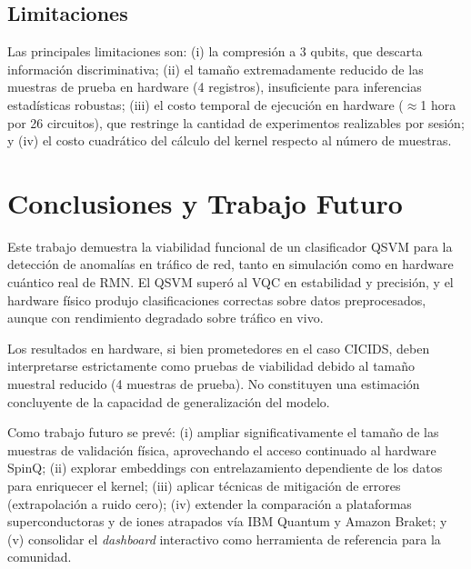 \documentclass[10pt,conference]{IEEEtran}
\begin{document}
\subsection{Limitaciones}
Las principales limitaciones son: (i) la compresión a 3 qubits, que
descarta información discriminativa; (ii) el tamaño extremadamente
reducido de las muestras de prueba en hardware (4 registros),
insuficiente para inferencias estadísticas robustas; (iii) el costo
temporal de ejecución en hardware ($\approx$1 hora por 26 circuitos),
que restringe la cantidad de experimentos realizables por sesión; y
(iv) el costo cuadrático del cálculo del kernel respecto al número de
muestras.

\section{Conclusiones y Trabajo Futuro}
Este trabajo demuestra la viabilidad funcional de un clasificador QSVM
para la detección de anomalías en tráfico de red, tanto en simulación
como en hardware cuántico real de RMN. El QSVM superó al VQC en
estabilidad y precisión, y el hardware físico produjo clasificaciones
correctas sobre datos preprocesados, aunque con rendimiento degradado
sobre tráfico en vivo.

Los resultados en hardware, si bien prometedores en el caso CICIDS,
deben interpretarse estrictamente como pruebas de viabilidad debido al
tamaño muestral reducido (4 muestras de prueba). No constituyen una
estimación concluyente de la capacidad de generalización del modelo.

Como trabajo futuro se prevé: (i) ampliar significativamente el tamaño
de las muestras de validación física, aprovechando el acceso continuado
al hardware SpinQ; (ii) explorar embeddings con entrelazamiento
dependiente de los datos para enriquecer el kernel; (iii) aplicar
técnicas de mitigación de errores (extrapolación a ruido cero); (iv)
extender la comparación a plataformas superconductoras y de iones
atrapados vía IBM Quantum y Amazon Braket; y (v) consolidar el
\textit{dashboard} interactivo como herramienta de referencia para la
comunidad.
\end{document}
